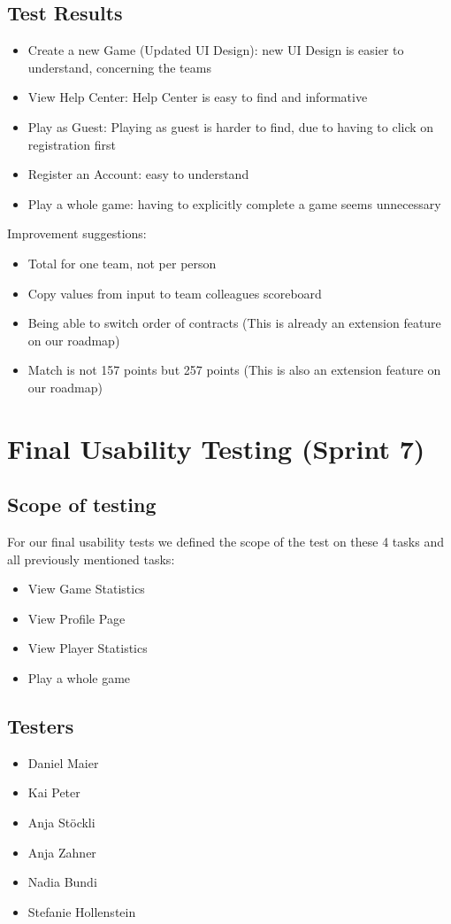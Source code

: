 \subsection{Test Results}
\begin{itemize}
    \item Create a new Game (Updated UI Design): new UI Design is easier to understand, concerning the teams
    \item View Help Center: Help Center is easy to find and informative
    \item Play as Guest: Playing as guest is harder to find, due to having to click on registration first
    \item Register an Account: easy to understand
    \item Play a whole game: having to explicitly complete a game seems unnecessary
\end{itemize}
Improvement suggestions: 
\begin{itemize}
    \item Total for one team, not per person
    \item Copy values from input to team colleagues scoreboard
    \item Being able to switch order of contracts (This is already an extension feature on our roadmap)
    \item Match is not 157 points but 257 points (This is also an extension feature on our roadmap)
\end{itemize}

\section{Final Usability Testing (Sprint 7)}

\subsection{Scope of testing}
For our final usability tests we defined the scope of the test on these 4 tasks and all previously mentioned tasks:
\begin{itemize}
    \item View Game Statistics
    \item View Profile Page
    \item View Player Statistics
    \item Play a whole game
\end{itemize}

\subsection{Testers}
\begin{itemize}
    \item Daniel Maier
    \item Kai Peter
    \item Anja Stöckli
    \item Anja Zahner
    \item Nadia Bundi
    \item Stefanie Hollenstein
\end{itemize}

